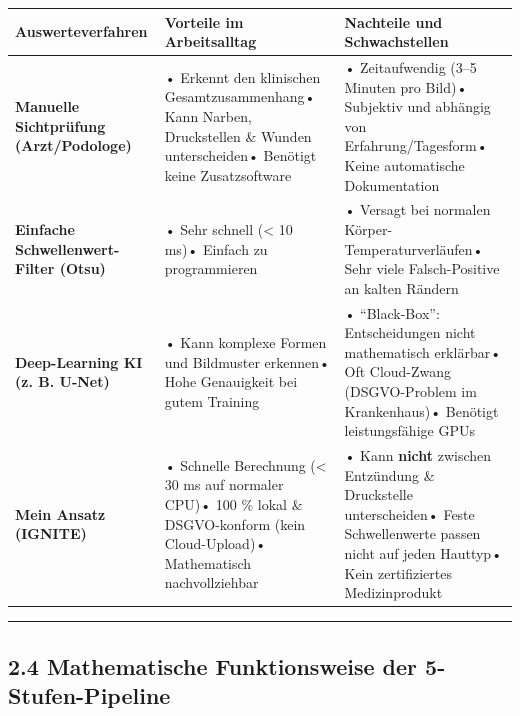 \documentclass[
  11pt,
]{article}
\newcounter{none} %
\begin{document}
{\def\LTcaptype{none} %
\begin{longtable}[]{@{}
  >{\raggedright\arraybackslash}p{}
  >{\raggedright\arraybackslash}p{}
  >{\raggedright\arraybackslash}p{}@{}}
\toprule\noalign{}
\begin{minipage}[b]{\linewidth}\raggedright
Auswerteverfahren
\end{minipage} & \begin{minipage}[b]{\linewidth}\raggedright
Vorteile im Arbeitsalltag
\end{minipage} & \begin{minipage}[b]{\linewidth}\raggedright
Nachteile und Schwachstellen
\end{minipage} \\
\midrule\noalign{}
\endhead
\bottomrule\noalign{}
\endlastfoot
\textbf{Manuelle Sichtprüfung (Arzt/Podologe)} & • Erkennt den
klinischen Gesamtzusammenhang• Kann Narben, Druckstellen \& Wunden
unterscheiden• Benötigt keine Zusatzsoftware & • Zeitaufwendig (3--5
Minuten pro Bild)• Subjektiv und abhängig von Erfahrung/Tagesform• Keine
automatische Dokumentation \\
\textbf{Einfache Schwellenwert-Filter (Otsu)} & • Sehr schnell
(\textless{} 10 ms)• Einfach zu programmieren & • Versagt bei normalen
Körper-Temperaturverläufen• Sehr viele Falsch-Positive an kalten
Rändern \\
\textbf{Deep-Learning KI (z. B. U-Net)} & • Kann komplexe Formen und
Bildmuster erkennen• Hohe Genauigkeit bei gutem Training & •
``Black-Box'': Entscheidungen nicht mathematisch erklärbar• Oft
Cloud-Zwang (DSGVO-Problem im Krankenhaus)• Benötigt leistungsfähige
GPUs \\
\textbf{Mein Ansatz (IGNITE)} & • Schnelle Berechnung (\textless{} 30 ms
auf normaler CPU)• 100 \% lokal \& DSGVO-konform (kein Cloud-Upload)•
Mathematisch nachvollziehbar & • Kann \textbf{nicht} zwischen Entzündung
\& Druckstelle unterscheiden• Feste Schwellenwerte passen nicht auf
jeden Hauttyp• Kein zertifiziertes Medizinprodukt \\
\end{longtable}
}

\begin{center}\rule{0.5\linewidth}{0.5pt}\end{center}

\subsection{2.4 Mathematische Funktionsweise der
5-Stufen-Pipeline}\label{mathematische-funktionsweise-der-5-stufen-pipeline}
\end{document}
